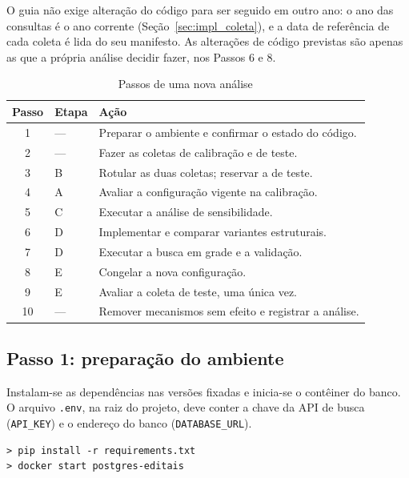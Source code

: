 O guia não exige alteração do código para ser seguido em outro ano: o ano das
consultas é o ano corrente (Seção~\ref{sec:impl_coleta}), e a data de
referência de cada coleta é lida do seu manifesto. As alterações de código
previstas são apenas as que a própria análise decidir fazer, nos Passos 6 e 8.

\begin{table}[htbp]
\centering
\caption{Passos de uma nova análise}
\label{tab:guia}
\small
\begin{tabularx}{\textwidth}{c l X}
\toprule
Passo & Etapa & Ação \\
\midrule
1 & --- & Preparar o ambiente e confirmar o estado do código. \\
2 & --- & Fazer as coletas de calibração e de teste. \\
3 & B   & Rotular as duas coletas; reservar a de teste. \\
4 & A   & Avaliar a configuração vigente na calibração. \\
5 & C   & Executar a análise de sensibilidade. \\
6 & D   & Implementar e comparar variantes estruturais. \\
7 & D   & Executar a busca em grade e a validação. \\
8 & E   & Congelar a nova configuração. \\
9 & E   & Avaliar a coleta de teste, uma única vez. \\
10 & --- & Remover mecanismos sem efeito e registrar a análise. \\
\bottomrule
\end{tabularx}
\end{table}

\subsection{Passo 1: preparação do ambiente}

Instalam-se as dependências nas versões fixadas e inicia-se o contêiner do
banco. O arquivo \texttt{.env}, na raiz do projeto, deve conter a chave da API
de busca (\texttt{API\_KEY}) e o endereço do banco (\texttt{DATABASE\_URL}).

\begin{footnotesize}
\begin{verbatim}
> pip install -r requirements.txt
> docker start postgres-editais
\end{verbatim}
\end{footnotesize}

